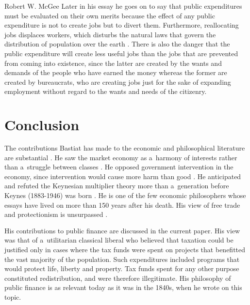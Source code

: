 \begin{artengenv}{Robert W. McGee}
Later in his essay he goes on to say that public expenditures must be evaluated on their own merits because the effect of any public expenditure is not to create jobs but to divert them. Furthermore, reallocating jobs displaces workers, which disturbs the natural laws that govern the distribution of population over the earth 
\parencite[][p.41]{bastiat_selected_1964}. %
 There is also the danger that the public expenditure will create less useful jobs than the jobs that are prevented from coming into existence, since the latter are created by the wants and demands of the people who have earned the money whereas the former are created by bureaucrats, who are creating jobs just for the sake of expanding employment without regard to the wants and needs of the citizenry.



\section{Conclusion}

The contributions Bastiat has made to the economic and philosophical literature are substantial 
\parencite[][]{mcgee_relevance_2014}. %
 He saw the market economy as a~harmony of interests rather than a~struggle between classes 
\parencite[][]{braun_bastiat_2011}. %
 He opposed government intervention in the economy, since intervention would cause more harm than good 
\parencite[][]{hulsmann_bastiats_2001}. %
 He anticipated and refuted the Keynesian multiplier theory more than a~generation before Keynes (1883-1946) was born 
\parencite[][]{mcgee_keynes_2014}. %
 He is one of the few economic philosophers whose essays have lived on more than 150 years after his death. His view of free trade and protectionism is unsurpassed 
\parencite[][]{mcgee_economic_2014}.%




His contributions to public finance are discussed in the current paper. His view was that of a~utilitarian classical liberal who believed that taxation could be justified only in cases where the tax funds were spent on projects that benefitted the vast majority of the population. Such expenditures included programs that would protect life, liberty and property. Tax funds spent for any other purpose constituted redistribution, and were therefore illegitimate. His philosophy of public finance is as relevant today as it was in the 1840s, when he wrote on this topic.




\end{artengenv}


